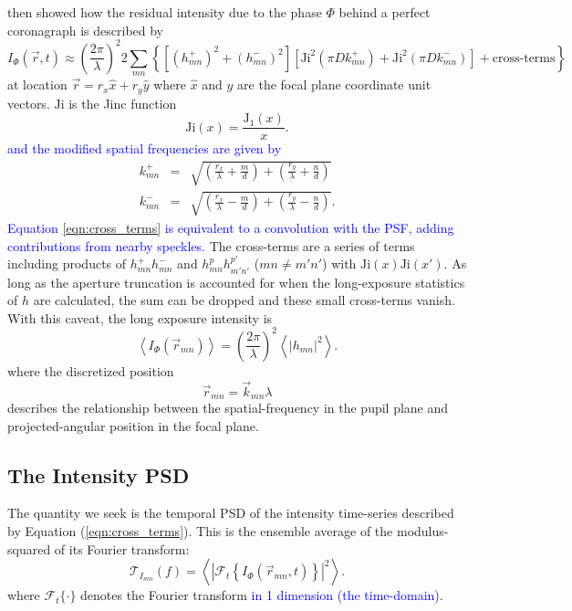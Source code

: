 \documentclass[10pt,preprint]{aastex631}
\newcommand{\jrmadd}[1]{\textcolor{blue}{#1}}
\newcommand{\Ji}{\mathrm{Ji}}
\begin{document}
\citet{2018JATIS...4a9001M} then showed how the residual intensity due to the phase $\Phi$ behind a perfect coronagraph is described by
\begin{equation}
I_\Phi(\vec{r},t) \approx \left(\frac{2\pi}{\lambda}\right)^2 2 \sum_{mn} \left\{  \left[ (h_{mn}^{+})^2 + (h_{mn}^{-})^2 \right] \left[ \Ji^2(\pi D k_{mn}^+) +\Ji^2(\pi D k_{mn}^-)\right] + \mbox{cross-terms} \right\}
\label{eqn:cross_terms}
\end{equation}
at location $\vec{r} = r_x \hat{x} + r_y\hat{y}$ where  $\hat{x}$ and  $\hat{y}$ are the focal plane coordinate unit vectors. $\Ji$ is the Jinc function
\begin{equation}
\Ji(x) = \frac{\mathrm{J}_1(x)}{x}.
\end{equation}
\jrmadd{and the modified spatial frequencies are given by} 
\begin{eqnarray}
k_{mn}^+ &=& \sqrt{\left(\frac{r_x}{\lambda} + \frac{m}{d}\right) + \left(\frac{r_y}{\lambda} + \frac{n}{d}\right)} \\ 
k_{mn}^- &=& \sqrt{\left(\frac{r_x}{\lambda} - \frac{m}{d}\right) + \left(\frac{r_y}{\lambda} - \frac{n}{d}\right)}. \nonumber
\end{eqnarray}
\jrmadd{Equation \ref{eqn:cross_terms} is equivalent to a convolution with the PSF, adding contributions from nearby speckles.}  The cross-terms are a series of terms including products of $h_{mn}^+h_{mn}^-$ and $h_{mn}^ph_{m'n'}^{p'}$ ($mn \neq m'n'$) with $\Ji(x)\Ji(x')$.  As long as the aperture truncation is accounted for when the long-exposure statistics of $h$ are calculated, the sum can be dropped and these small cross-terms vanish.  With this caveat, the long exposure intensity is 
\begin{equation}
\left< I_\Phi(\vec{r}_{mn}) \right> =  \left(\frac{2\pi}{\lambda}\right)^2\left< |h_{mn}|^2 \right> .
\label{eqn:contrast_h2}
\end{equation}
where the discretized position 
\begin{equation}
\vec{r}_{mn} = \vec{k}_{mn} \lambda
\end{equation}
describes the relationship between the spatial-frequency in the pupil plane and projected-angular position in the focal plane.

\subsection{The Intensity PSD}

The quantity we seek is the temporal PSD of the intensity time-series described by Equation (\ref{eqn:cross_terms}).  This is the ensemble average of the modulus-squared of its Fourier transform:
\begin{equation}
\mathcal{T}_{I_{mn}}(f) = \left\langle \left| \mathcal{F}_t \left\{ I_\Phi(\vec{r}_{mn},t) \right\} \right|^2 \right\rangle.
\end{equation}
where $\mathcal{F}_t\{\cdot\}$ denotes the Fourier transform \jrmadd{in 1 dimension (the time-domain)}.
\end{document}
